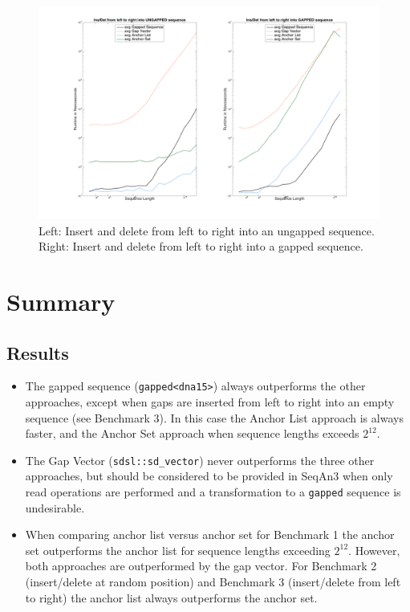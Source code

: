 \documentclass[11pt, letterpaper, twoside]{article}
\begin{document}
\begin{figure}[htpb]\centering
\includegraphics[scale=.4,trim={5cm 2cm 4.5cm 1.5cm},clip]{benchmark3_plot.png}
\caption{Left: Insert and delete from left to right into an ungapped sequence. Right: 
Insert and delete from left to right into a gapped sequence.}
\end{figure}

\section{Summary}
\subsection{Results}
\begin{itemize}
	\item The gapped sequence (\verb|gapped<dna15>|) always outperforms the other approaches, except when gaps are inserted from left to right into an empty sequence (see Benchmark 3). In this case the Anchor List approach is always faster, and the Anchor Set approach when sequence lengths exceeds $2^{12}$.
	\item The Gap Vector (\verb|sdsl::sd_vector|) never outperforms the three other approaches, but should be considered to be provided in SeqAn3 when only read operations are performed and a transformation to a \verb|gapped| sequence is undesirable. 
	\item When comparing anchor list versus anchor set for Benchmark 1 the anchor set outperforms the anchor list for sequence lengths exceeding $2^{12}$. However, both approaches are outperformed by the gap vector. For Benchmark 2 (insert/delete at random position) and Benchmark 3 (insert/delete from left to right) the anchor list always outperforms the anchor set.    
\end{itemize}
\end{document}
